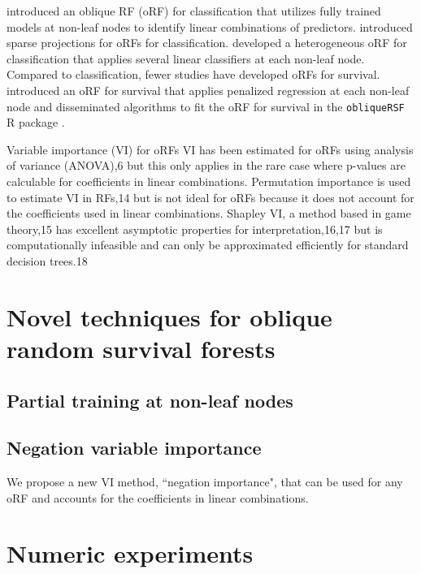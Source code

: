 \documentclass[twoside,11pt]{article}\usepackage[]{graphicx}\usepackage[]{color}
\begin{document}
\citet{zhu2015reinforcement}

\citet{zhu2013tree}

\citet{menze2011oblique} introduced an oblique RF (oRF) for classification that utilizes fully trained models at non-leaf nodes to identify linear combinations of predictors. \citet{tomita2020sparse} introduced sparse projections for oRFs for classification. \citet{katuwal2020heterogeneous} developed a heterogeneous oRF for classification that applies several linear classifiers at each non-leaf node. Compared to classification, fewer studies have developed oRFs for survival. \citet{jaeger2019oblique} introduced an oRF for survival that applies penalized regression at each non-leaf node and disseminated algorithms to fit the oRF for survival in the \texttt{obliqueRSF} R package \citep{obliqueRSF}.

Variable importance (VI) for oRFs VI has been estimated for oRFs using analysis of variance (ANOVA),6 but this only applies in the rare case where p-values are calculable for coefficients in linear combinations. Permutation importance is used to estimate VI in RFs,14 but is not ideal for oRFs because it does not account for the coefficients used in linear combinations. Shapley VI, a method based in game theory,15 has excellent asymptotic properties for interpretation,16,17 but is computationally infeasible and can only be approximated efficiently for standard decision trees.18

\section{Novel techniques for oblique random survival forests}

\subsection{Partial training at non-leaf nodes}

\subsection{Negation variable importance}

We propose a new VI method, ``negation importance",  that can be used for any oRF and accounts for the coefficients in linear combinations.

\section{Numeric experiments}
\end{document}
